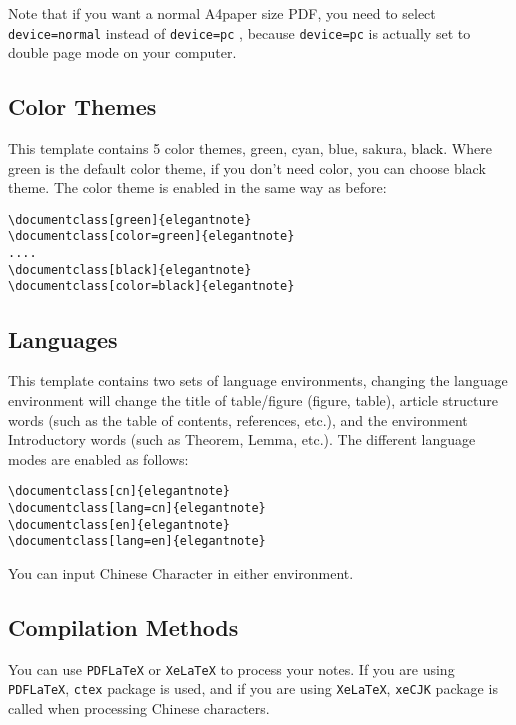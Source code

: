 \documentclass[geye,green,pad,en]{elegantnote}
\begin{document}
\begin{note}
Note that if you want a normal A4paper size PDF, you need to select \lstinline{device=normal} instead of \lstinline{device=pc} , because \lstinline{device=pc} is actually set to double page mode on your computer.
\end{note}
\subsection{Color Themes}
This template contains 5 color themes, \textcolor{egreen}{green}, \textcolor{ecyan}{cyan}, \textcolor{eblue}{blue}, \textcolor{sakura}{sakura}, \textcolor{black}{black}. Where green is the default color theme, if you don't need color, you can choose black theme. The color theme is enabled in the same way as before:
\begin{lstlisting}[frame=none]  
\documentclass[green]{elegantnote}
\documentclass[color=green]{elegantnote}
....
\documentclass[black]{elegantnote}
\documentclass[color=black]{elegantnote}
\end{lstlisting}

\subsection{Languages}
This template contains two sets of language environments, changing the language environment will change the title of table/figure (figure, table), article structure words (such as the table of contents, references, etc.), and the environment Introductory words (such as Theorem, Lemma, etc.). The different language modes are enabled as follows:
\begin{lstlisting}[frame=none]  
\documentclass[cn]{elegantnote}
\documentclass[lang=cn]{elegantnote}
\documentclass[en]{elegantnote}
\documentclass[lang=en]{elegantnote}
\end{lstlisting}
\begin{note}
You can input Chinese Character in either environment.
\end{note}

\subsection{Compilation Methods}

You can use \lstinline{PDFLaTeX} or \lstinline{XeLaTeX} to process your notes. If you are using \lstinline{PDFLaTeX}, \lstinline{ctex} package is used, and if you are using \lstinline{XeLaTeX}, \lstinline{xeCJK} package is called when processing Chinese characters. 
\end{document}
